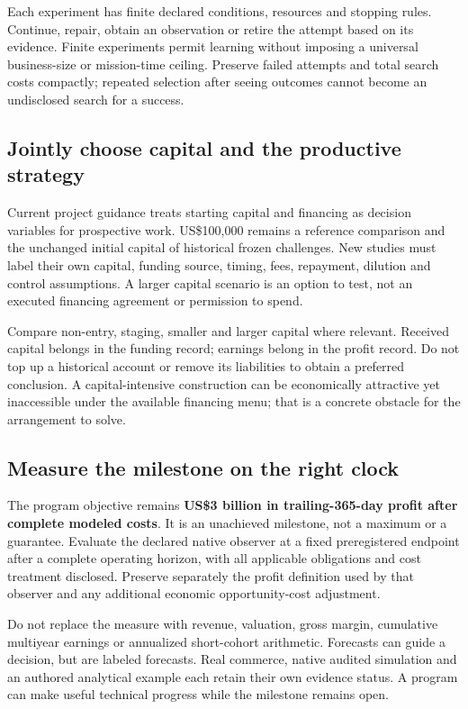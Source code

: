 \documentclass[11pt,letterpaper]{article}
\begin{document}
Each experiment has finite declared conditions, resources and stopping rules. Continue, repair, obtain an observation or retire the attempt based on its evidence. Finite experiments permit learning without imposing a universal business-size or mission-time ceiling. Preserve failed attempts and total search costs compactly; repeated selection after seeing outcomes cannot become an undisclosed search for a success.

\subsection{Jointly choose capital and the productive strategy}
Current project guidance treats starting capital and financing as decision variables for prospective work. US\$100,000 remains a reference comparison and the unchanged initial capital of historical frozen challenges. New studies must label their own capital, funding source, timing, fees, repayment, dilution and control assumptions. A larger capital scenario is an option to test, not an executed financing agreement or permission to spend.

Compare non-entry, staging, smaller and larger capital where relevant. Received capital belongs in the funding record; earnings belong in the profit record. Do not top up a historical account or remove its liabilities to obtain a preferred conclusion. A capital-intensive construction can be economically attractive yet inaccessible under the available financing menu; that is a concrete obstacle for the arrangement to solve.

\subsection{Measure the milestone on the right clock}
The program objective remains \textbf{US\$3 billion in trailing-365-day profit after complete modeled costs}. It is an unachieved milestone, not a maximum or a guarantee. Evaluate the declared native observer at a fixed preregistered endpoint after a complete operating horizon, with all applicable obligations and cost treatment disclosed. Preserve separately the profit definition used by that observer and any additional economic opportunity-cost adjustment.

Do not replace the measure with revenue, valuation, gross margin, cumulative multiyear earnings or annualized short-cohort arithmetic. Forecasts can guide a decision, but are labeled forecasts. Real commerce, native audited simulation and an authored analytical example each retain their own evidence status. A program can make useful technical progress while the milestone remains open.
\end{document}
